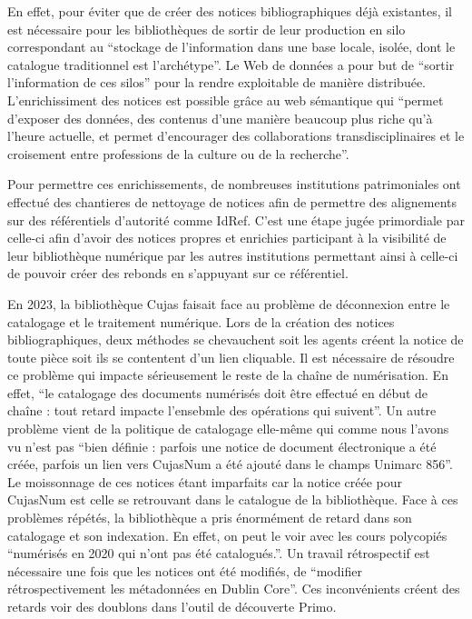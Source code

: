 En effet, pour éviter que de créer des notices bibliographiques déjà existantes, il est nécessaire pour les bibliothèques de sortir de leur production en silo correspondant au \enquote{stockage de l'information dans une base locale, isolée, dont le catalogue traditionnel est l'archétype}. Le Web de données a pour but de \enquote{sortir l'information de ces silos} pour la rendre exploitable de manière distribuée. L'enrichissiment des notices est possible grâce au web sémantique qui \enquote{permet d'exposer des données, des contenus d'une manière beaucoup plus riche qu'à l'heure actuelle, et permet d'encourager des collaborations transdisciplinaires et le croisement entre professions de la culture ou de la recherche}. 

Pour permettre ces enrichissements, de nombreuses institutions patrimoniales ont effectué des chantieres de nettoyage de notices afin de permettre des alignements sur des référentiels d'autorité comme IdRef. C'est une étape jugée primordiale par celle-ci afin d'avoir des notices propres et enrichies participant à la visibilité de leur bibliothèque numérique par les autres institutions permettant ainsi à celle-ci de pouvoir créer des rebonds en s'appuyant sur ce référentiel. 

En 2023, la bibliothèque Cujas faisait face au problème de déconnexion entre le catalogage et le traitement numérique. Lors de la création des notices bibliographiques, deux méthodes se chevauchent soit les agents créent la notice de toute pièce soit ils se contentent d'un lien cliquable. Il est nécessaire de résoudre ce problème qui impacte sérieusement le reste de la chaîne de numérisation. En effet, \enquote{le catalogage des documents numérisés doit être effectué en début de chaîne : tout retard impacte l'ensebmle des opérations qui suivent}. Un autre problème vient de la politique de catalogage elle-même qui comme nous l'avons vu n'est pas \enquote{bien définie : parfois une notice de document électronique a été créée, parfois un lien vers CujasNum a été ajouté dans le champs Unimarc 856}. Le moissonnage de ces notices étant imparfaits car la notice créée pour CujasNum est celle se retrouvant dans le catalogue de la bibliothèque. Face à ces problèmes répétés, la bibliothèque a pris énormément de retard dans son catalogage et son indexation. En effet, on peut le voir avec les cours polycopiés \enquote{numérisés en 2020 qui n'ont pas été catalogués.}. Un travail rétrospectif est nécessaire une fois que les notices ont été modifiés, de \enquote{modifier rétrospectivement les métadonnées en Dublin Core}. Ces inconvénients créent des retards voir des doublons dans l'outil de découverte Primo. 

